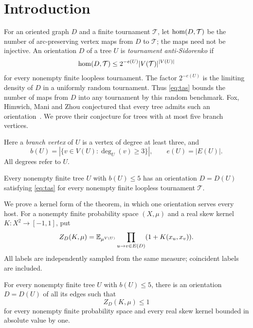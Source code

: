 \section{Introduction}\label{sec:intro}
For an oriented graph $D$ and a finite tournament $\mathcal T$, let
$\operatorname{hom}(D,\mathcal T)$ be the number of arc-preserving vertex maps from
$D$ to $\mathcal T$; the maps need not be injective. An orientation $D$
of a tree $U$ is \emph{tournament anti-Sidorenko} if
\begin{equation}\label{eq:tas}
 \operatorname{hom}(D,\mathcal T)\le 2^{-e(U)}|V(\mathcal T)|^{|V(U)|}
\end{equation}
for every nonempty finite loopless tournament. The factor $2^{-e(U)}$
is the limiting density of $D$ in a uniformly random tournament. Thus
\eqref{eq:tas} bounds the number of maps from $D$ into any tournament
by this random benchmark. Fox, Himwich, Mani and Zhou conjectured that every tree
admits such an orientation~\cite[Conjecture 1.12]{FHMZ}. We prove their
conjecture for trees with at most five branch vertices.

Here a \emph{branch vertex} of $U$ is a vertex of degree at least three,
and
\[
 b(U)=|\{v\in V(U):\deg_U(v)\ge3\}|,\qquad e(U)=|E(U)|.
\]
All degrees refer to $U$.

\begin{theorem}\label{thm:main}
Every nonempty finite tree $U$ with $b(U)\le5$ has an orientation
$D=D(U)$ satisfying \eqref{eq:tas} for every nonempty finite loopless
tournament $\mathcal T$.
\end{theorem}

We prove a kernel form of the theorem, in which one orientation serves
every host. For a nonempty finite probability space $(X,\mu)$ and a real
skew kernel $K:X^2\to[-1,1]$, put
\begin{equation}\label{eq:density}
 Z_D(K,\mu)=\mathbb E_{\mu^{V(U)}}
       \prod_{u\to v\in E(D)}(1+K(x_u,x_v)).
\end{equation}
All labels are independently sampled from the same measure; coincident
labels are included.
\begin{theorem}\label{thm:kernel}
For every nonempty finite tree $U$ with $b(U)\le5$, there is an
orientation $D=D(U)$ of all its edges such that
\begin{equation}\label{eq:kernelbound}
 Z_D(K,\mu)\le1
\end{equation}
for every nonempty finite probability space and every real skew kernel
bounded in absolute value by one.
\end{theorem}

